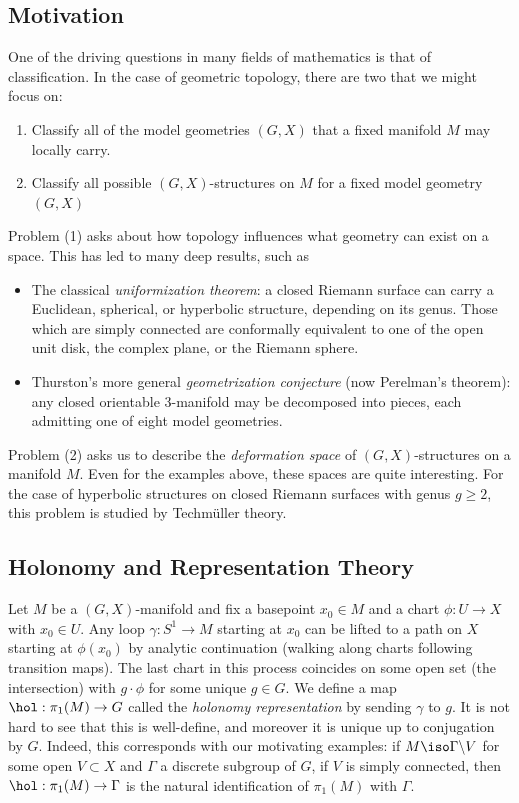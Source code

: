 \documentclass{article}
\begin{document}
\subsection{Motivation}
One of the driving questions in many fields of mathematics is that of classification. In the case of geometric topology, there are two that we might focus on:
\begin{enumerate}
	\item Classify all of the model geometries $(G,X)$ that a fixed manifold $M$ may locally carry.
	\item Classify all possible $(G,X)$-structures on $M$ for a fixed model geometry $(G,X)$
\end{enumerate}
Problem (1) asks about how topology influences what geometry can exist on a space. This has led to many deep results, such as
\begin{itemize}
	\item The classical \textit{uniformization theorem}: a closed Riemann surface can carry a Euclidean, spherical, or hyperbolic structure, depending on its genus. Those which are simply connected are conformally equivalent to one of the open unit disk, the complex plane, or the Riemann sphere.
	\item Thurston's more general \textit{geometrization conjecture} (now Perelman's theorem): any closed orientable 3-manifold may be decomposed into pieces, each admitting one of eight model geometries. 
\end{itemize}

Problem (2) asks us to describe the \textit{deformation space} of $(G,X)$-structures on a manifold $M$. Even for the examples above, these spaces are quite interesting. For the case of hyperbolic structures on closed Riemann surfaces with genus $g \geq 2$, this problem is studied by Techm\"uller theory.

\subsection{Holonomy and Representation Theory}
Let $M$ be a $(G,X)$-manifold and fix a basepoint $x_0 \in M$ and a chart $\phi: U \to X$ with $x_0 \in U$. Any loop $\gamma: S^1 \to M$ starting at $x_0$ can be lifted to a path on $X$ starting at $\phi(x_0)$ by analytic continuation (walking along charts following transition maps). The last chart in this process coincides on some open set (the intersection) with $g \cdot \phi$ for some unique $g \in G$. We define a map $\hol: \pi_1(M) \to G$ called the \textit{holonomy representation} by sending $\gamma$ to $g$. It is not hard to see that this is well-define, and moreover it is unique up to conjugation by $G$. Indeed, this corresponds with our motivating examples: if $M \iso \Gamma \backslash V$ for some open $V \subset X$ and $\Gamma$ a discrete subgroup of $G$, if $V$ is simply connected, then $\hol: \pi_1(M) \to \Gamma$ is the natural identification of $\pi_1(M)$ with $\Gamma$.
\end{document}
